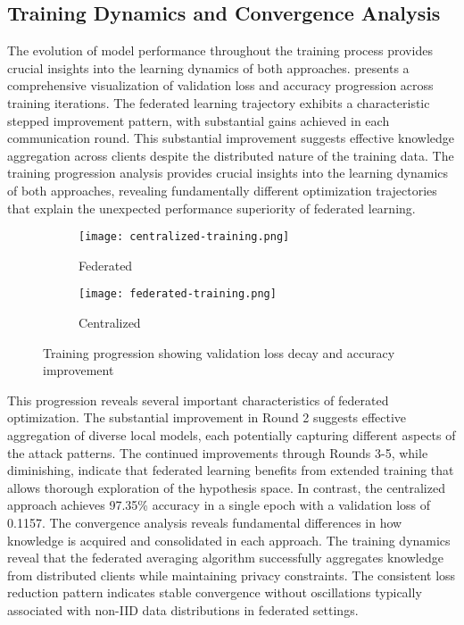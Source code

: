 \newpage
\subsection{Training Dynamics and Convergence Analysis}
The evolution of model performance throughout the training process provides crucial insights into the learning dynamics of both approaches.  presents a comprehensive visualization of validation loss and accuracy progression across training iterations. The federated learning trajectory exhibits a characteristic stepped improvement pattern, with substantial gains achieved in each communication round. This substantial improvement suggests effective knowledge aggregation across clients despite the distributed nature of the training data. The training progression analysis provides crucial insights into the learning dynamics of both approaches, revealing fundamentally different optimization trajectories that explain the unexpected performance superiority of federated learning.

\begin{figure}[H]
	\centering
	\begin{subfigure}[b]{0.45\textwidth}
		\centering
		\texttt{[image: centralized-training.png]}
		\caption{\centering Federated}
		\label{figure:centralized-training}
	\end{subfigure}
	\hspace{0.25cm} 
	\begin{subfigure}[b]{0.45\textwidth}
		\centering
		\texttt{[image: federated-training.png]}
		\caption{\centering Centralized}
		\label{figure:federated-training}
	\end{subfigure}
	\caption{Training progression showing validation loss decay and accuracy improvement}
	\label{figure:training-progression}
\end{figure}

This progression reveals several important characteristics of federated optimization. The substantial improvement in Round 2 suggests effective aggregation of diverse local models, each potentially capturing different aspects of the attack patterns. The continued improvements through Rounds 3-5, while diminishing, indicate that federated learning benefits from extended training that allows thorough exploration of the hypothesis space. In contrast, the centralized approach achieves 97.35\% accuracy in a single epoch with a validation loss of 0.1157. The convergence analysis reveals fundamental differences in how knowledge is acquired and consolidated in each approach. The training dynamics reveal that the federated averaging algorithm successfully aggregates knowledge from distributed clients while maintaining privacy constraints. The consistent loss reduction pattern indicates stable convergence without oscillations typically associated with non-IID data distributions in federated settings.

